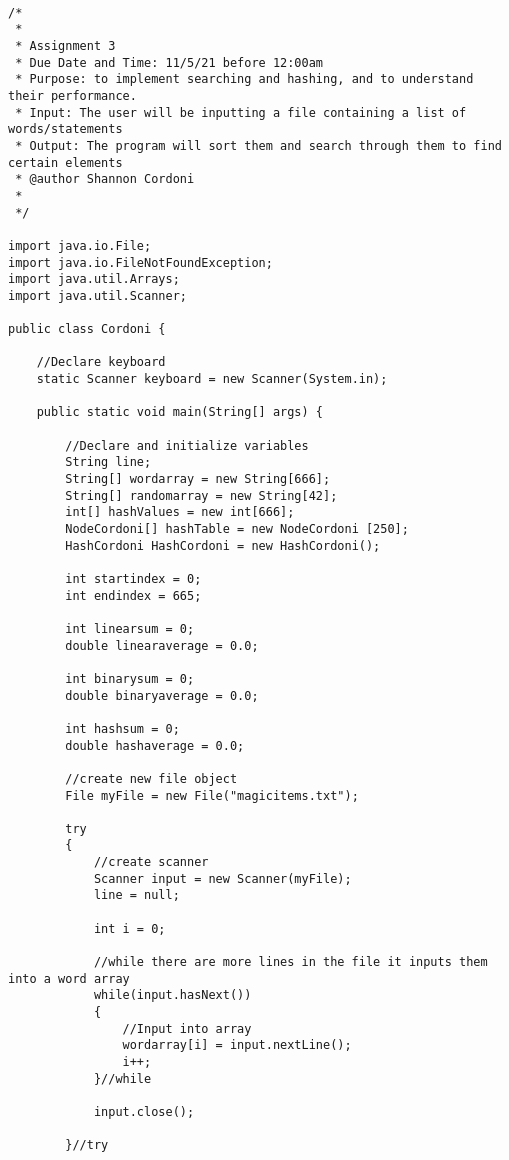 \documentclass[letterpaper, 10pt,DIV=13]{scrartcl}
\numberwithin{equation}{section} %
\numberwithin{figure}{section} %
\numberwithin{table}{section} %
\begin{document}
\lstset{numbers=left, numberstyle=\tiny, stepnumber=1, numbersep=5pt, basicstyle=\footnotesize\ttfamily}
\begin{lstlisting}[frame=single, ] 

/*
 * 
 * Assignment 3
 * Due Date and Time: 11/5/21 before 12:00am 
 * Purpose: to implement searching and hashing, and to understand their performance.
 * Input: The user will be inputting a file containing a list of words/statements
 * Output: The program will sort them and search through them to find certain elements
 * @author Shannon Cordoni 
 * 
 */

import java.io.File;
import java.io.FileNotFoundException;
import java.util.Arrays;
import java.util.Scanner;

public class Cordoni {

    //Declare keyboard 
    static Scanner keyboard = new Scanner(System.in);
    
    public static void main(String[] args) {

        //Declare and initialize variables 
        String line;
        String[] wordarray = new String[666];
        String[] randomarray = new String[42];
        int[] hashValues = new int[666];
        NodeCordoni[] hashTable = new NodeCordoni [250];
        HashCordoni HashCordoni = new HashCordoni();

        int startindex = 0;
        int endindex = 665;

        int linearsum = 0;
        double linearaverage = 0.0;

        int binarysum = 0;
        double binaryaverage = 0.0;

        int hashsum = 0;
        double hashaverage = 0.0;
            
        //create new file object
        File myFile = new File("magicitems.txt");
        
        try
        {
            //create scanner
            Scanner input = new Scanner(myFile);
            line = null;
            
            int i = 0;

            //while there are more lines in the file it inputs them into a word array
            while(input.hasNext())
            {  
                //Input into array 
                wordarray[i] = input.nextLine();        
                i++;
            }//while

            input.close();  

        }//try
        

\end{lstlisting}
\end{document}
